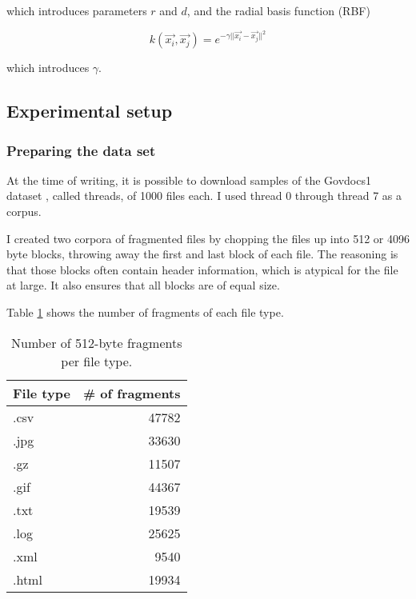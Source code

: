 which introduces parameters $r$ and $d$, and the radial basis
function (RBF)

$$ k(\vec{x_{i}}, \vec{x_{j}}) = e^{-\gamma ||\vec{x_{i}}
- \vec{x_{j}}||^{2}} $$

which introduces $\gamma$.

\subsection{Experimental setup}

\subsubsection{Preparing the data set}

At the time of writing, it is possible to download samples of the Govdocs1
dataset \cite{Garfinkel2009}, called threads, of 1000 files each. I used
thread 0 through thread 7 as a corpus.

I created two corpora of fragmented files by chopping the files up into 512 or
4096 byte blocks, throwing away the first and last block of each file. The
     reasoning is that those blocks often contain header information, which is
     atypical for the file at large. It also ensures that all blocks are of
     equal size.

Table \ref{table:number_of_fragments} shows the number of fragments of each file type.

\begin{table}
\begin{tabular}{lr}
\hline
 File type   &   \# of fragments \\
\hline
 .csv        &                 47782 \\
 .jpg        &                 33630 \\
 .gz         &                 11507 \\
 .gif        &                 44367 \\
 .txt        &                 19539 \\
 .log        &                 25625 \\
 .xml        &                 9540  \\
 .html       &                 19934  \\
\hline
\end{tabular}
\caption{Number of 512-byte fragments per file type.}
\label{table:number_of_fragments}
\end{table}



